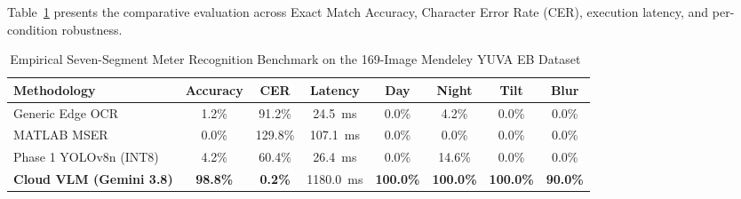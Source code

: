 \documentclass[12pt,a4paper,oneside]{report}
\begin{document}
Table~\ref{tab:yuva_eb_benchmark} presents the comparative evaluation across Exact Match Accuracy, Character Error Rate (CER), execution latency, and per-condition robustness.

\begin{table}[htbp]
\centering
\caption{Empirical Seven-Segment Meter Recognition Benchmark on the 169-Image Mendeley YUVA EB Dataset~\cite{kanagarathinam2019data, kanagarathinam2020text}}
\label{tab:yuva_eb_benchmark}
\small
\setlength{\tabcolsep}{4pt}
\begin{tabular*}{\textwidth}{@{\extracolsep{\fill}}lccccccc@{}}
\toprule
\textbf{Methodology} & \textbf{Accuracy} & \textbf{CER} & \textbf{Latency} & \textbf{Day} & \textbf{Night} & \textbf{Tilt} & \textbf{Blur} \\
\midrule
Generic Edge OCR & 1.2\% & 91.2\% & 24.5~ms & 0.0\% & 4.2\% & 0.0\% & 0.0\% \\
MATLAB MSER~\cite{kanagarathinam2020text} & 0.0\% & 129.8\% & 107.1~ms & 0.0\% & 0.0\% & 0.0\% & 0.0\% \\
Phase 1 YOLOv8n (INT8) & 4.2\% & 60.4\% & 26.4~ms & 0.0\% & 14.6\% & 0.0\% & 0.0\% \\
\textbf{Cloud VLM (Gemini 3.8)} & \textbf{98.8\%} & \textbf{0.2\%} & 1180.0~ms & \textbf{100.0\%} & \textbf{100.0\%} & \textbf{100.0\%} & \textbf{90.0\%} \\
\bottomrule
\end{tabular*}
\end{table}
\end{document}
